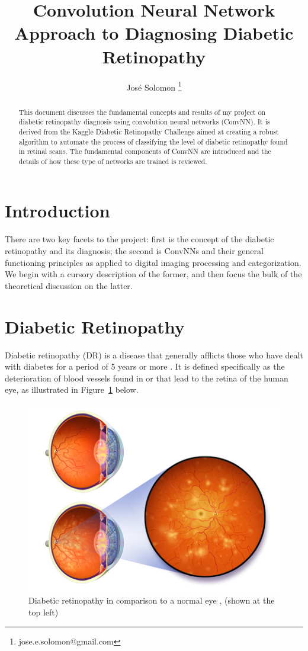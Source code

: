 \documentclass[letterpaper,12pt]{article}
\title{Convolution Neural Network Approach to Diagnosing Diabetic Retinopathy}
\author{Jos\'e Solomon \thanks{jose.e.solomon@gmail.com} }
\date{}
\newcommand{\figref}[1]{Figure~\ref{#1}}
\begin{document}
\maketitle
\begin{abstract}
This document discusses the fundamental concepts and results of my project on diabetic retinopathy diagnosis using convolution neural networks (ConvNN). It is derived from the Kaggle Diabetic Retinopathy Challenge \cite{kaggle} aimed at creating a robust algorithm to automate the process of classifying the level of diabetic retinopathy found in retinal scans. The fundamental components of ConvNN are introduced and the details of how these type of networks are trained is reviewed.
\end{abstract}
\tableofcontents

\section{Introduction}

There are two key facets to the project: first is the concept of the diabetic retinopathy and its diagnosis; the second is ConvNNs and their general functioning principles as applied to digital imaging processing and categorization. We begin with a cursory description of the former, and then focus the bulk of the theoretical discussion on the latter.

\section{Diabetic Retinopathy}

Diabetic retinopathy (DR) is a disease that generally afflicts those who have dealt with diabetes for a period of 5 years or more \cite{nih}. It is defined specifically as the deterioration of blood vessels found in or that lead to the retina of the human eye, as illustrated in \figref{eye} below.

\begin{figure}[htbp]
\begin{center}
\includegraphics[scale=0.6]{images/illustration.png}
\caption{Diabetic retinopathy in comparison to a normal eye \cite{wiki}, (shown at the top left)}
\label{eye}
\end{center}
\end{figure}
\end{document}
